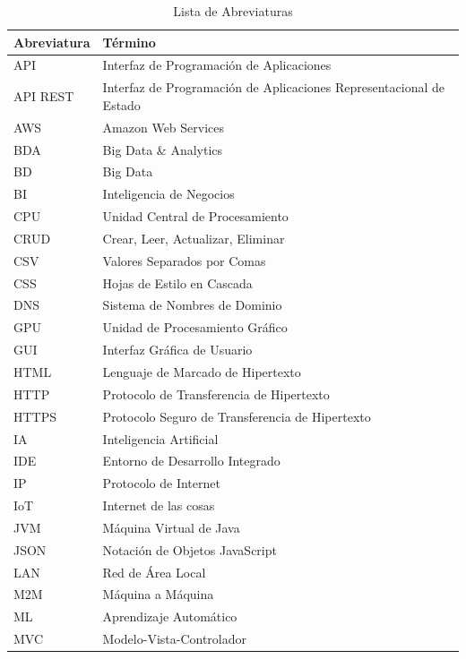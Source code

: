 \documentclass[
  11pt,
  bookmarksnumbered]{article}
\begin{document}
\begin{table}[H]
\centering
\caption{Lista de Abreviaturas} %
\label{tab:abreviaturas}
\fontsize{12}{12}\selectfont %
\begin{tabular}{|l|l|}
\hline
\textbf{Abreviatura} & \textbf{Término} \\ \hline
API & Interfaz de Programación de Aplicaciones \\ \hline
API REST & Interfaz de Programación de Aplicaciones Representacional de Estado \\ \hline
AWS & Amazon Web Services \\ \hline
BDA & Big Data \& Analytics \\ \hline
BD & Big Data \\ \hline
BI & Inteligencia de Negocios \\ \hline
CPU & Unidad Central de Procesamiento \\ \hline
CRUD & Crear, Leer, Actualizar, Eliminar \\ \hline
CSV & Valores Separados por Comas \\ \hline
CSS & Hojas de Estilo en Cascada \\ \hline
DNS & Sistema de Nombres de Dominio \\ \hline
GPU & Unidad de Procesamiento Gráfico \\ \hline
GUI & Interfaz Gráfica de Usuario \\ \hline
HTML & Lenguaje de Marcado de Hipertexto \\ \hline
HTTP & Protocolo de Transferencia de Hipertexto \\ \hline
HTTPS & Protocolo Seguro de Transferencia de Hipertexto \\ \hline
IA & Inteligencia Artificial \\ \hline
IDE & Entorno de Desarrollo Integrado \\ \hline
IP & Protocolo de Internet \\ \hline
IoT & Internet de las cosas \\ \hline
JVM & Máquina Virtual de Java \\ \hline
JSON & Notación de Objetos JavaScript \\ \hline
LAN & Red de Área Local \\ \hline
M2M & Máquina a Máquina \\ \hline
ML & Aprendizaje Automático \\ \hline
MVC & Modelo-Vista-Controlador \\ \hline

\end{tabular}
\end{table}
\end{document}
